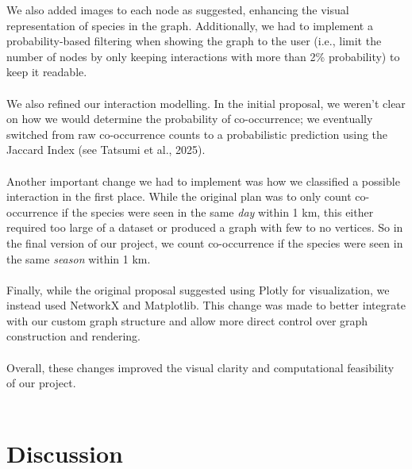 \documentclass{article}
\begin{document}
We also added images to each node as suggested, enhancing the visual representation of species in the graph. Additionally, we had to implement a probability-based filtering when showing the graph to the user (i.e., limit the number of nodes by only keeping interactions with more than 2\% probability) to keep it readable. \\ \\ 
We also refined our interaction modelling. In the initial proposal, we weren't clear on how we would determine the probability of co-occurrence; we eventually switched from raw co-occurrence counts to a probabilistic prediction using the Jaccard Index (see Tatsumi et al., 2025). \\ \\
Another important change we had to implement was how we classified a possible interaction in the first place. While the original plan was to only count co-occurrence if the species were seen in the same \textit{day} within 1 km, this either required too large of a dataset or produced a graph with few to no vertices. So in the final version of our project, we count co-occurrence if the species were seen in the same \textit{season} within 1 km. \\ \\
Finally, while the original proposal suggested using Plotly for visualization, we instead used NetworkX and Matplotlib. This change was made to better integrate with our custom graph structure and allow more direct control over graph construction and rendering.\\ \\
Overall, these changes improved the visual clarity and computational feasibility of our project. \\ \\



\section{Discussion}
\end{document}
